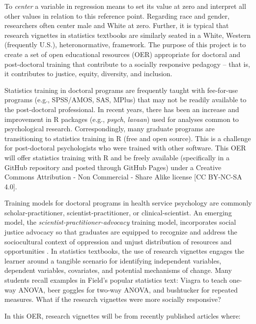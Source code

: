 \documentclass[
  11pt,
]{book}
\begin{document}
To \emph{center} a variable in regression means to set its value at zero and interpret all other values in relation to this reference point. Regarding race and gender, researchers often center male and White at zero. Further, it is typical that research vignettes in statistics textbooks are similarly seated in a White, Western (frequently U.S.), heteronormative, framework. The purpose of this project is to create a set of open educational resources (OER) appropriate for doctoral and post-doctoral training that contribute to a socially responsive pedagogy -- that is, it contributes to justice, equity, diversity, and inclusion.

Statistics training in doctoral programs are frequently taught with fee-for-use programs (e.g., SPSS/AMOS, SAS, MPlus) that may not be readily available to the post-doctoral professional. In recent years, there has been an increase and improvement in R packages (e.g., \emph{psych}, \emph{lavaan}) used for analyses common to psychological research. Correspondingly, many graduate programs are transitioning to statistics training in R (free and open source). This is a challenge for post-doctoral psychologists who were trained with other software. This OER will offer statistics training with R and be freely available (specifically in a GitHub repository and posted through GitHub Pages) under a Creative Commons Attribution - Non Commercial - Share Alike license {[}CC BY-NC-SA 4.0{]}.

Training models for doctoral programs in health service psychology are commonly scholar-practitioner, scientist-practitioner, or clinical-scientist. An emerging model, the \emph{scientist-practitioner-advocacy} training model, incorporates social justice advocacy so that graduates are equipped to recognize and address the sociocultural context of oppression and unjust distribution of resources and opportunities \citep{mallinckrodt_scientist-practitioner-advocate_2014}. In statistics textbooks, the use of research vignettes engages the learner around a tangible scenario for identifying independent variables, dependent variables, covariates, and potential mechanisms of change. Many students recall examples in Field's \citeyearpar{field_discovering_2012} popular statistics text: Viagra to teach one-way ANOVA, beer goggles for two-way ANOVA, and bushtucker for repeated measures. What if the research vignettes were more socially responsive?

In this OER, research vignettes will be from recently published articles where:
\end{document}
